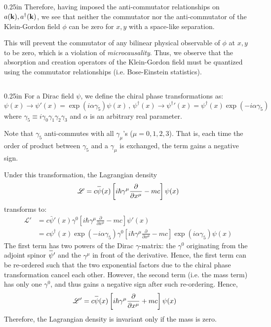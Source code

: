 \documentclass[letterpaper,12pt]{article}
\newenvironment{problem}{\subsection{}\begin{adjustwidth}{0.25in}{}\vspace{-\baselineskip}}{\end{adjustwidth}}
\newcommand{\pder}[2]{\frac{\partial #1}{\partial #2}}
\newcommand{\lagr}{\mathscr{L}}
\newcommand{\define}{\equiv}
\newcommand{\overbar}[1]{
	\mkern 1.5mu \overline{\mkern-1.5mu\raisebox{0pt}[\dimexpr\height+0.5mm\relax]{$#1$}\mkern-1.5mu}\mkern 1.5mu
}
\begin{document}
\begin{problem}
Therefore, having imposed the anti-commutator relationships on $a(\vb{k}), a^\dagger(\vb{k})$, we see that neither the commutator nor the anti-commutator of the Klein-Gordon field $\phi$ can be zero for $x,y$ with a space-like separation.

This will prevent the commutator of any bilinear physical observable of $\phi$ at $x,y$ to be zero, which is a violation of \emph{microcausality}. Thus, we observe that the absorption and creation operators of the Klein-Gordon field must be quantized using the commutator relationships (i.e. Bose-Einstein statistics).
\end{problem}



\begin{problem}
For a Dirac field $\psi$, we define the chiral phase transformations as:
\begin{equation*}
	\psi(x) \rightarrow \psi'(x) = \exp(i\alpha\gamma_5)\psi(x) \,, \,
	\psi^\dagger(x) \rightarrow {\psi^\dagger}'(x) = \psi^\dagger(x)\exp(-i\alpha\gamma_5)
\end{equation*}
where $\gamma_5 \define i\gamma_0\gamma_1\gamma_2\gamma_3$ and $\alpha$ is an arbitrary real parameter.

Note that $\gamma_5$ anti-commutes with all $\gamma_\mu$'s ($\mu=0, 1, 2, 3$). That is, each time the order of product between $\gamma_5$ and a $\gamma_\mu$ is exchanged, the term gains a negative sign.

Under this transformation, the Lagrangian density
\begin{equation*}
	\lagr = c\overbar{\psi}(x)\left[i\hbar\gamma^\mu\pder{}{x^\mu} - mc\right]\psi(x)
\end{equation*}
transforms to:
\begin{align*}
	\lagr' &= c {\bar{\psi}}'(x) \gamma^0 \left[i\hbar\gamma^\mu\pder{}{x^\mu} - mc\right] \psi'(x)	\\
	&= c \psi^\dagger(x) \exp(-i\alpha\gamma_5) \gamma^0 \left[i\hbar\gamma^\mu\pder{}{x^\mu} - mc\right] \exp(i\alpha\gamma_5) \psi(x)
\end{align*}
The first term has two powers of the Dirac $\gamma$-matrix: the $\gamma^0$ originating from the adjoint spinor $\overbar{\psi}'$ and the $\gamma^\mu$ in front of the derivative. Hence, the first term can be re-ordered such that the two exponential factors due to the chiral phase transformation cancel each other. However, the second term (i.e. the mass term) has only one $\gamma^0$, and thus gains a negative sign after such re-ordering. Hence,
\begin{align*}
	\lagr' &= c \overbar{\psi}(x)\left[i\hbar\gamma^\mu\pder{}{x^\mu} + mc\right]\psi(x)
\end{align*}
Therefore, the Lagrangian density is invariant only if the mass is zero.


\end{problem}
\end{document}

